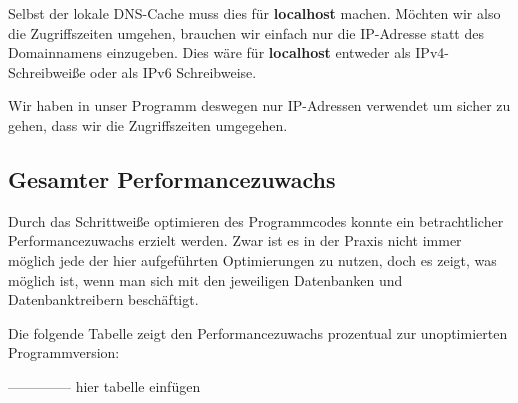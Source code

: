 Selbst der lokale DNS-Cache muss dies \zB für \textbf{localhost} machen.
Möchten wir also die Zugriffszeiten umgehen, brauchen wir einfach nur die IP-Adresse
statt des Domainnamens einzugeben. Dies wäre für \textbf{localhost} entweder  als
IPv4-Schreibweiße oder \gqq{[::1]} als IPv6 Schreibweise.

Wir haben in unser Programm deswegen nur IP-Adressen verwendet um sicher zu gehen, dass wir 
die Zugriffszeiten umgegehen.

\subsection{Gesamter Performancezuwachs}
Durch das Schrittweiße optimieren des Programmcodes konnte ein betrachtlicher
Performancezuwachs erzielt werden. Zwar ist es in der Praxis nicht immer möglich
jede der hier aufgeführten Optimierungen zu nutzen, doch es zeigt, was möglich
ist, wenn man sich mit den jeweiligen Datenbanken und Datenbanktreibern beschäftigt.

Die folgende Tabelle zeigt den Performancezuwachs prozentual zur unoptimierten
Programmversion:

-------------- hier tabelle einfügen

\clearpage